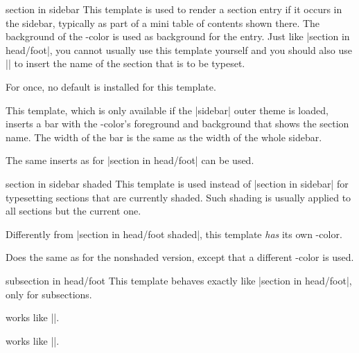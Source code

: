 \begin{element}{section in sidebar}\yes\yes\yes
  This template is used to render a section entry if it occurs in the sidebar, typically as part of a mini table of contents shown there. The background of the \beamer-color is used as background for the entry. Just like |section in head/foot|, you cannot usually use this template yourself and you should also use |\insertsectionhead| to insert the name of the section that is to be typeset.

  For once, no default is installed for this template.

  \begin{templateoptions}
    This template, which is only available if the |sidebar| outer theme is loaded, inserts a bar with the \beamer-color's foreground and background that shows the section name. The width of the bar is the same as the width of the whole sidebar.
  \end{templateoptions}

  The same inserts as for |section in head/foot| can be used.
\end{element}

\begin{element}{section in sidebar shaded}\yes\yes\no
  This template is used instead of |section in sidebar| for typesetting sections that are currently shaded. Such shading is usually applied to all sections but the current one.

  Differently from |section in head/foot shaded|, this template \emph{has} its own \beamer-color.

  \begin{templateoptions}
    Does the same as for the nonshaded version, except that a different \beamer-color is used.
  \end{templateoptions}
\end{element}

\begin{element}{subsection in head/foot}\yes\yes\yes
  This template behaves exactly like |section in head/foot|, only for subsections.
  \begin{itemize}
    \iteminsert{\insertsubsectionhead}
    works like |\insertsectionhead|.

    \iteminsert{\insertsubsectionheadnumber}
    works like |\insertsectionheadnumber|.
  \end{itemize}
\end{element}

